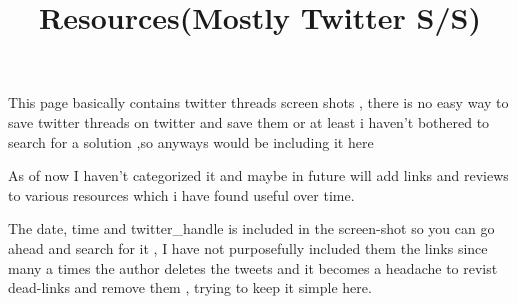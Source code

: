 \documentclass[
  letterpaper,
  DIV=11,
  numbers=noendperiod]{scrartcl}
\title{Resources(Mostly Twitter S/S)}
\author{}
\date{}
\begin{document}
\maketitle
This page basically contains twitter threads screen shots , there is no
easy way to save twitter threads on twitter and save them or at least i
haven't bothered to search for a solution ,so anyways would be including
it here

As of now I haven't categorized it and maybe in future will add links
and reviews to various resources which i have found useful over time.

The date, time and twitter_handle is included in the screen-shot so you
can go ahead and search for it , I have not purposefully included them
the links since many a times the author deletes the tweets and it
becomes a headache to revist dead-links and remove them , trying to keep
it simple here.

\thinrule

\startsectionlevel[title={Quantitative
Finance},reference={quantitative-finance}]

\startsectionlevel[title={Stochastic
Calculus},reference={stochastic-calculus}]

\thinrule

\stopsectionlevel

\stopsectionlevel

\startsectionlevel[title={Mathematics},reference={mathematics}]

\startsectionlevel[title={Statistics},reference={statistics}]

\stopsectionlevel

\stopsectionlevel

\startsectionlevel[title={Programming},reference={programming}]

\startsectionlevel[title={R},reference={r}]

\stopsectionlevel

\startsectionlevel[title={Python},reference={python}]

\stopsectionlevel

\startsectionlevel[title={C+++},reference={c}]

\stopsectionlevel

\startsectionlevel[title={Rust},reference={rust}]

\stopsectionlevel

\stopsectionlevel

\startsectionlevel[title={Data Science , Machine Learning and Deep
learning},reference={data-science-machine-learning-and-deep-learning}]

\stopsectionlevel

\startsectionlevel[title={Trading},reference={trading}]

\stopsectionlevel

\startsectionlevel[title={TradFi and Finance
books},reference={tradfi-and-finance-books}]

\stopsectionlevel
\end{document}
